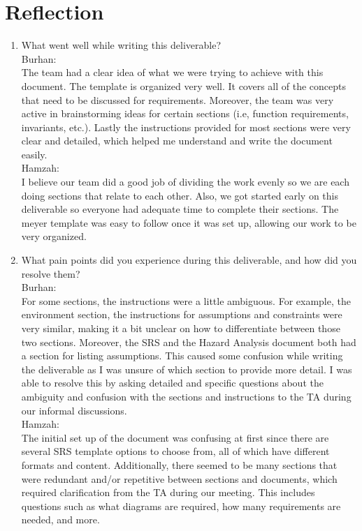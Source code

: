 \documentclass[12pt,letterpaper]{article}
\begin{document}
\section{Reflection}
\begin{enumerate} 

\item What went well while writing this deliverable?  \\
Burhan: \\
The team had a clear idea of what we were trying to achieve with this document. The template is organized very well. It covers all of the concepts that need to be discussed for requirements. Moreover, the team was very active in brainstorming ideas for certain sections (i.e, function requirements, invariants, etc.). Lastly the instructions provided for most sections were very clear and detailed, which helped me understand and write the document easily.  
\\

Hamzah: \\
I believe our team did a good job of dividing the work evenly so we are each doing sections that relate to each other. Also, we got started early on this deliverable so everyone had adequate time to complete their sections. The meyer template was easy to follow once it was set up, allowing our work to be very organized. 
\\
\item What pain points did you experience during this deliverable, and how did you resolve them? \\
Burhan:\\ 

For some sections, the instructions were a little ambiguous. For example, the environment section, the instructions for assumptions and constraints were very similar, making it a bit unclear on how to differentiate between those two sections. Moreover, the SRS and the Hazard Analysis document both had a section for listing assumptions. This caused some confusion while writing the deliverable as I was unsure of which section to provide more detail. I was able to resolve this by asking detailed and specific questions about the ambiguity and confusion with the sections and instructions to the TA during our informal discussions. 
\\
 

Hamzah: \\
The initial set up of the document was confusing at first since there are several SRS template options to choose from, all of which have different formats and content. Additionally, there seemed to be many sections that were redundant and/or repetitive between sections and documents, which required clarification from the TA during our meeting. This includes questions such as what diagrams are required, how many requirements are needed, and more. 
\\
 


\end{enumerate}
\end{document}

